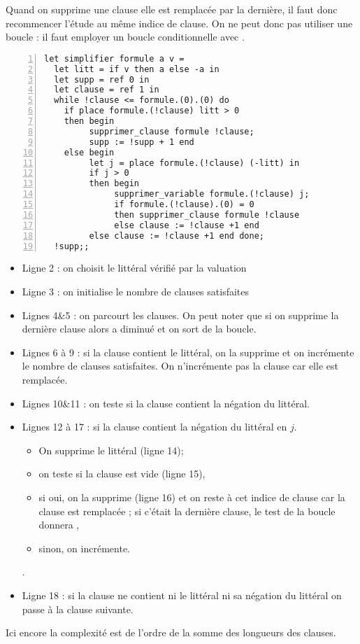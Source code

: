 \begin{Answer}
Quand on supprime une clause elle est remplacée par la dernière, il faut donc recommencer l'étude au même indice de clause. On ne peut donc pas utiliser une boucle  : il faut employer un boucle conditionnelle avec .
\begin{lstlisting}[numbers=left]
let simplifier formule a v =
  let litt = if v then a else -a in
  let supp = ref 0 in
  let clause = ref 1 in
  while !clause <= formule.(0).(0) do
    if place formule.(!clause) litt > 0
    then begin
         supprimer_clause formule !clause;
         supp := !supp + 1 end
    else begin
         let j = place formule.(!clause) (-litt) in
         if j > 0
         then begin
              supprimer_variable formule.(!clause) j;
              if formule.(!clause).(0) = 0
              then supprimer_clause formule !clause
              else clause := !clause +1 end
         else clause := !clause +1 end done;
  !supp;;  
\end{lstlisting}

\begin{itemize}
  \item Ligne 2 : on choisit le littéral vérifié par la valuation
  \item Ligne 3 : on initialise le nombre de clauses satisfaites
  \item Lignes 4\&5 : on parcourt les clauses. On peut noter que si on supprime la dernière clause alors  a diminué et on sort de la boucle.
  \item Lignes 6 à 9 : si la clause contient le littéral, on la supprime et on incrémente le nombre de clauses satisfaites. On n'incrémente pas la clause car elle est remplacée.
  \item Lignes 10\&11 : on teste si la clause contient la négation du littéral.
  \item Lignes 12 à  17 : si la clause contient la négation du littéral en $j$.
  \begin{itemize}
    \item On supprime le littéral (ligne 14);
    \item on teste si la clause est vide (ligne 15),
    \item si oui, on la supprime (ligne 16) et on reste à cet indice de clause car la clause est remplacée ; si c'était la dernière clause, le test de la boucle  donnera ,
    \item sinon,  on incrémente.
  \end{itemize}.
  \item Ligne 18 : si la clause ne contient ni le littéral ni sa négation du littéral on passe à la clause suivante.
\end{itemize}

Ici encore la complexité est de l'ordre de la somme des longueurs des clauses.

\end{Answer}
